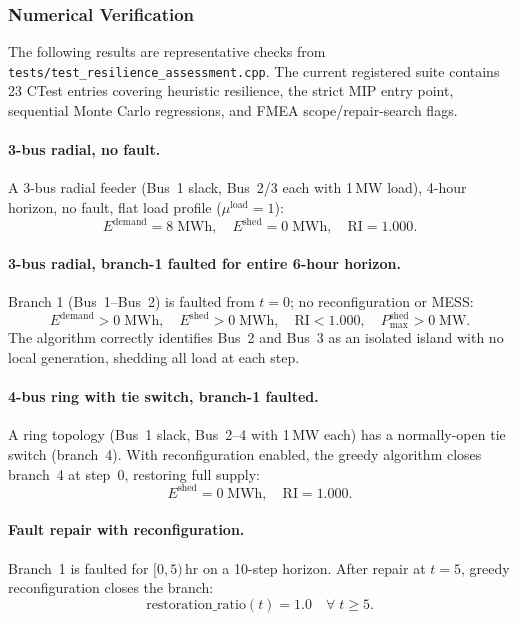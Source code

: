 \subsubsection{Numerical Verification}
\label{sec:resilience-numerical}

The following results are representative checks from
\texttt{tests/test\_resilience\_assessment.cpp}.  The current registered suite
contains 23 CTest entries covering heuristic resilience, the strict MIP entry
point, sequential Monte Carlo regressions, and FMEA scope/repair-search flags.

\paragraph{3-bus radial, no fault.}
A 3-bus radial feeder (Bus~1 slack, Bus~2/3 each with 1\,MW load),
4-hour horizon, no fault, flat load profile ($\mu^{\text{load}}=1$):
\[
  E^{\text{demand}} = 8\;\text{MWh},\quad
  E^{\text{shed}} = 0\;\text{MWh},\quad
  \mathrm{RI} = 1.000.
\]

\paragraph{3-bus radial, branch-1 faulted for entire 6-hour horizon.}
Branch 1 (Bus~1--Bus~2) is faulted from $t=0$; no reconfiguration or MESS:
\[
  E^{\text{demand}} > 0\;\text{MWh},\quad
  E^{\text{shed}} > 0\;\text{MWh},\quad
  \mathrm{RI} < 1.000,\quad
  P^{\text{shed}}_{\max} > 0\;\text{MW}.
\]
The algorithm correctly identifies Bus~2 and Bus~3 as an isolated island
with no local generation, shedding all load at each step.

\paragraph{4-bus ring with tie switch, branch-1 faulted.}
A ring topology (Bus~1 slack, Bus~2--4 with 1\,MW each) has a normally-open
tie switch (branch~4).  With reconfiguration enabled, the greedy algorithm
closes branch~4 at step~0, restoring full supply:
\[
  E^{\text{shed}} = 0\;\text{MWh},\quad
  \mathrm{RI} = 1.000.
\]

\paragraph{Fault repair with reconfiguration.}
Branch~1 is faulted for $[0,5)$\,hr on a 10-step horizon.  After repair
at $t=5$, greedy reconfiguration closes the branch:
\[
  \text{restoration\_ratio}(t) = 1.0 \quad \forall\; t \geq 5.
\]

